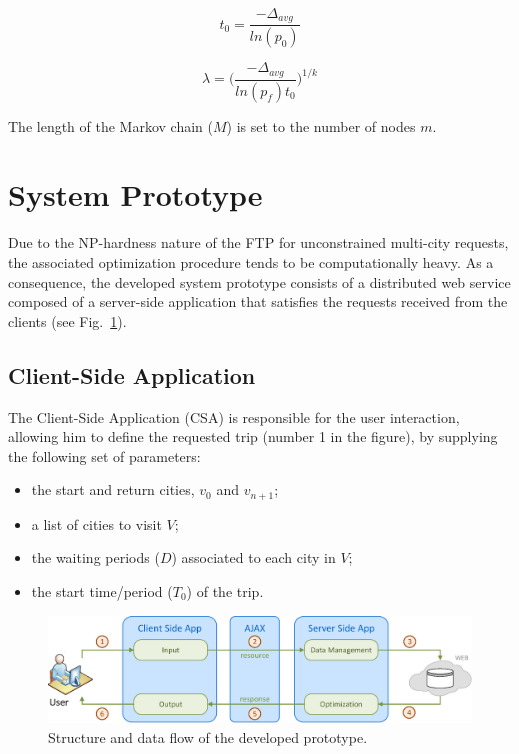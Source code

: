 \documentclass[onecolumn]{elsarticle}
\begin{document}
\begin{equation}
\label{eq:t_zero}
    t_0 = \frac{-\Delta_{avg}}{ln(p_0)}
\end{equation}

\begin{equation}
\label{eq:lambda}
    \lambda = \bigg( \frac{-\Delta_{avg}}{ln(p_f)t_0} \bigg)^{1/k}
\end{equation}

The length of the Markov chain ($M$) is set to the number of nodes $m$.
\section{System Prototype}
\label{sec:system}

Due to the NP-hardness nature of the FTP for unconstrained multi-city requests, the associated optimization procedure tends to be computationally heavy. As a consequence, the developed system prototype consists of a distributed web service composed of a server-side application that satisfies the requests received from the clients (see Fig.~\ref{fig:system_architecture_design}). 

\subsection{Client-Side Application}
\label{sec:csa}

The Client-Side Application (CSA) is responsible for the user interaction, allowing him to define the requested trip (number 1 in the figure), by supplying the following set of parameters:
\begin{itemize}
  \item the start and return cities, $v_{0}$ and $v_{n+1}$;
  \item a list of cities to visit $V$;
  \item the waiting periods ($D$) associated to each city in $V$;
  \item the start time/period ($T_{0}$) of the trip.
\end{itemize}

\begin{figure}
      \centering
      \includegraphics[width=1.0\columnwidth]{fig2.eps}
    \caption{Structure and data flow of the developed prototype.}
      \label{fig:system_architecture_design}  
\end{figure}
\end{document}
